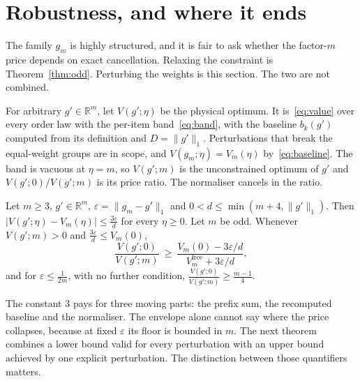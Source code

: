 \section{Robustness, and where it ends}
\label{sec:robust}

The family $g_{m}$ is highly structured, and it is fair to ask whether the factor-$m$ price
depends on exact cancellation. Relaxing the constraint is Theorem~\ref{thm:odd}. Perturbing
the weights is this section. The two are not combined.

For arbitrary $g'\in\mathbb{R}^{m}$, let $V(g';\eta)$ be the physical optimum. It
is~\eqref{eq:value} over every order law with the per-item band~\eqref{eq:band}, with the
baseline $b_{k}(g')$ computed from its definition and $D=\|g'\|_{1}$. Perturbations that break
the equal-weight groups are in scope, and $V(g_{m};\eta)=V_{m}(\eta)$
by~\eqref{eq:baseline}. The band is vacuous at $\eta=m$, so $V(g';m)$ is the unconstrained
optimum of $g'$ and $V(g';0)/V(g';m)$ is its price ratio. The normaliser cancels in the
ratio.

\begin{theorem}[Envelope]
\label{thm:robust}
Let $m\ge3$, $g'\in\mathbb{R}^{m}$, $\varepsilon=\|g_{m}-g'\|_{1}$ and
$0<d\le\min(m+4,\|g'\|_{1})$. Then $|V(g';\eta)-V_{m}(\eta)|\le\frac{3\varepsilon}{d}$ for
every $\eta\ge0$. Let $m$ be odd. Whenever $V(g';m)>0$ and $\frac{3\varepsilon}{d}\le V_{m}(0)$,
\[
\frac{V(g';0)}{V(g';m)}\ \ge\ \frac{V_{m}(0)-3\varepsilon/d}{V^{\mathrm{free}}_{m}+3\varepsilon/d},
\]
and for $\varepsilon\le\frac{1}{2m}$, with no further condition,
$\frac{V(g';0)}{V(g';m)}\ge\frac{m-1}{4}$.
\end{theorem}


The constant $3$ pays for three moving parts: the prefix sum, the recomputed baseline and the
normaliser. The envelope alone cannot say where the price collapses, because at fixed
$\varepsilon$ its floor is bounded in $m$. The next theorem combines a lower bound valid for every perturbation with an upper bound
achieved by one explicit perturbation. The distinction between those quantifiers matters.

